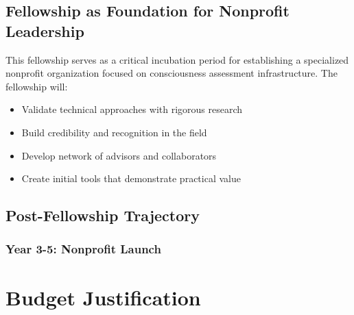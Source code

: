 \documentclass[11pt,a4paper]{article}
\begin{document}



\subsection{Fellowship as Foundation for Nonprofit Leadership}

This fellowship serves as a critical incubation period for establishing a specialized nonprofit organization focused on consciousness assessment infrastructure. The fellowship will:

\begin{itemize}
    \item Validate technical approaches with rigorous research
    \item Build credibility and recognition in the field
    \item Develop network of advisors and collaborators
    \item Create initial tools that demonstrate practical value
\end{itemize}

\subsection{Post-Fellowship Trajectory}

\subsubsection{Year 3-5: Nonprofit Launch}

\section{Budget Justification}
\label{sec:budget}
\end{document}
